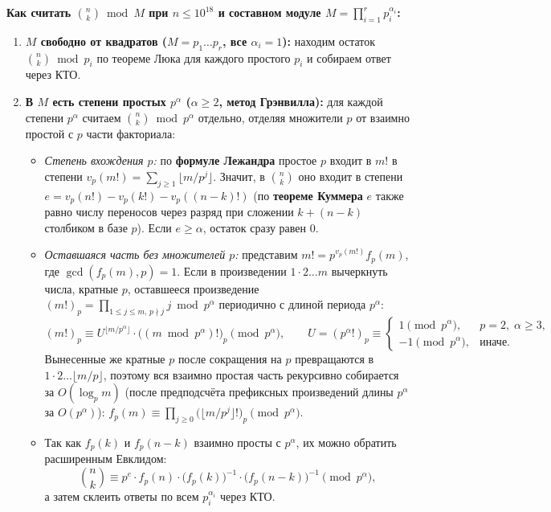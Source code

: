 \documentclass[10pt,a4paper]{article}
\renewcommand{\le}{\leqslant}
\renewcommand{\ge}{\geqslant}
\begin{document}
\textbf{Как считать $\binom{n}{k} \bmod M$ при $n \le 10^{18}$ и составном модуле $M = \prod_{i=1}^r p_i^{\alpha_i}$:}
\begin{enumerate}
  \item \textbf{$M$ свободно от квадратов ($M = p_1 \dots p_r$, все $\alpha_i = 1$):} находим остаток $\binom{n}{k} \bmod p_i$ по теореме Люка для каждого простого $p_i$ и собираем ответ через КТО.
  \item \textbf{В $M$ есть степени простых $p^\alpha$ ($\alpha \ge 2$, метод Грэнвилла):} для каждой степени $p^\alpha$ считаем $\binom{n}{k} \bmod p^\alpha$ отдельно, отделяя множители $p$ от взаимно простой с $p$ части факториала:
  \begin{itemize}
    \item \emph{Степень вхождения $p$:} по \textbf{формуле Лежандра} простое $p$ входит в $m!$ в степени $v_p(m!) = \sum_{j \ge 1} \lfloor m / p^j \rfloor$. Значит, в $\binom{n}{k}$ оно входит в степени $e = v_p(n!) - v_p(k!) - v_p((n - k)!)$ (по \textbf{теореме Куммера} $e$ также равно числу переносов через разряд при сложении $k + (n - k)$ столбиком в базе $p$). Если $e \ge \alpha$, остаток сразу равен $0$.
    \item \emph{Оставшаяся часть без множителей $p$:} представим $m! = p^{v_p(m!)} f_p(m)$, где $\gcd(f_p(m), p) = 1$. Если в произведении $1 \cdot 2 \dots m$ вычеркнуть числа, кратные $p$, оставшееся произведение $(m!)_p = \prod_{1 \le j \le m,\, p \nmid j} j \bmod p^\alpha$ периодично с длиной периода $p^\alpha$:
    \[
      (m!)_p \equiv U^{\lfloor m / p^\alpha \rfloor} \cdot \bigl((m \bmod p^\alpha)!\bigr)_p \pmod{p^\alpha}, \qquad
      U = (p^\alpha!)_p \equiv \begin{cases} 1 \pmod{p^\alpha}, & p = 2,\; \alpha \ge 3, \\ -1 \pmod{p^\alpha}, & \text{иначе.} \end{cases}
    \]
    Вынесенные же кратные $p$ после сокращения на $p$ превращаются в $1 \cdot 2 \dots \lfloor m / p \rfloor$, поэтому вся взаимно простая часть рекурсивно собирается за $O(\log_p m)$ (после предподсчёта префиксных произведений длины $p^\alpha$ за $O(p^\alpha)$): $f_p(m) \equiv \prod_{j \ge 0} \bigl(\lfloor m / p^j \rfloor !\bigr)_p \pmod{p^\alpha}$.
    \item Так как $f_p(k)$ и $f_p(n - k)$ взаимно просты с $p^\alpha$, их можно обратить расширенным Евклидом:
    \[
      \binom{n}{k} \equiv p^e \cdot f_p(n) \cdot \bigl(f_p(k)\bigr)^{-1} \cdot \bigl(f_p(n - k)\bigr)^{-1} \pmod{p^\alpha},
    \]
    а затем склеить ответы по всем $p_i^{\alpha_i}$ через КТО.
  \end{itemize}
\end{enumerate}
\end{document}
